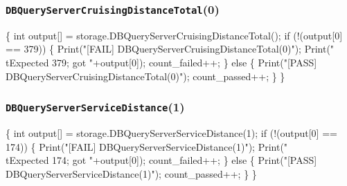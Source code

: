 \documentclass{article}
\def\nwendcode{\endtrivlist \endgroup}
\let\nwdocspar=\par
\begin{document}
\subsubsection{{\tt{}DBQueryServerCruisingDistanceTotal}(0)}
\nwenddocs{}\endmoddef{}
\{
  int output[] = storage.DBQueryServerCruisingDistanceTotal();
  if (!(output[0] == 379)) \{
    Print("[FAIL] DBQueryServerCruisingDistanceTotal(0)");
    Print("\\tExpected 379; got "+output[0]);
    count_failed++;
  \} else \{
    Print("[PASS] DBQueryServerCruisingDistanceTotal(0)");
    count_passed++;
  \}
\}
\nwendcode{}\nwdocspar
\subsubsection{{\tt{}DBQueryServerServiceDistance}(1)}
\nwenddocs{}\endmoddef{}
\{
  int output[] = storage.DBQueryServerServiceDistance(1);
  if (!(output[0] == 174)) \{
    Print("[FAIL] DBQueryServerServiceDistance(1)");
    Print("\\tExpected 174; got "+output[0]);
    count_failed++;
  \} else \{
    Print("[PASS] DBQueryServerServiceDistance(1)");
    count_passed++;
  \}
\}
\nwendcode{}\nwdocspar
\end{document}
